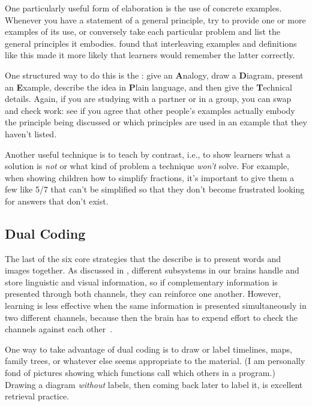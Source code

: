 One particularly useful form of elaboration is the use of concrete examples.
Whenever you have a statement of a general principle,
try to provide one or more examples of its use,
or conversely take each particular problem and list the general principles it embodies.
\cite{Raws2014} found that interleaving examples and definitions like this
made it more likely that learners would remember the latter correctly.

One structured way to do this is
the :
give an \textbf{A}nalogy,
draw a \textbf{D}iagram,
present an \textbf{E}xample,
describe the idea in \textbf{P}lain language,
and then give the \textbf{T}echnical details.
Again,
if you are studying with a partner or in a group,
you can swap and check work:
see if you agree that other people's examples actually embody the principle being discussed
or which principles are used in an example that they haven't listed.

Another useful technique is to teach by contrast,
i.e.,
to show learners what a solution is \emph{not}
or what kind of problem a technique \emph{won't} solve.
For example,
when showing children how to simplify fractions,
it's important to give them a few like 5/7 that can't be simplified
so that they don't become frustrated looking for answers that don't exist.

\subsection*{Dual Coding}

The last of the six core strategies
that the  describe
is to present words and images together.
As discussed in ,
different subsystems in our brains handle and store linguistic and visual information,
so if complementary information is presented through both channels,
they can reinforce one another.
However,
learning is less effective when the same information is presented simultaneously in two different channels,
because then the brain has to expend effort to check the channels against each other~\cite{Maye2003}.

One way to take advantage of dual coding is to draw or label timelines,
maps, family trees,
or whatever else seems appropriate to the material.
(I am personally fond of pictures showing which functions call which others in a program.)
Drawing a diagram \emph{without} labels,
then coming back later to label it,
is excellent retrieval practice.

